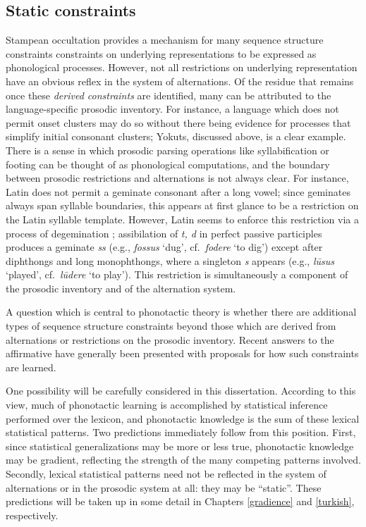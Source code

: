 \subsection{Static constraints}

Stampean occultation provides a mechanism for many sequence structure constraints constraints on underlying representations to be expressed as phonological processes. 
However, not all restrictions on underlying representation have an obvious reflex in the system of alternations.
Of the residue that remains once these \emph{derived constraints} are identified, many can be attributed to the language-specific prosodic inventory.
For instance, a language which does not permit onset clusters may do so without there being evidence for processes that simplify initial consonant clusters; Yokuts, discussed above, is a clear example.
There is a sense in which prosodic parsing operations like syllabification or footing can be thought of as phonological computations, and the boundary between prosodic restrictions and alternations is not always clear.
For instance, Latin does not permit a geminate consonant after a long vowel; since geminates always span syllable boundaries, this appears at first glance to be a restriction on the Latin syllable template.
However, Latin seems to enforce this restriction via a process of degemination \citep{GormanInPressc}; assibilation of \emph{t, d} in perfect passive participles produces a geminate \emph{ss} (e.g., 
\emph{fossus} `dug', cf.~\emph{fodere} `to dig') except after diphthongs and long monophthongs, where a singleton \emph{s} appears (e.g., \emph{lūsus} `played', cf.~\emph{lūdere} `to play').
This restriction is simultaneously a component of the prosodic inventory and of the alternation system.

A question which is central to phonotactic theory is whether there are additional types of sequence structure constraints beyond those which are derived from alternations or restrictions on the prosodic inventory.
Recent answers to the affirmative have generally been presented with proposals for how such constraints are learned.

One possibility will be carefully considered in this dissertation.
According to this view, much of phonotactic learning is accomplished by statistical inference performed over the lexicon, and phonotactic knowledge is the sum of these lexical statistical patterns.
Two predictions immediately follow from this position.
First, since statistical generalizations may be more or less true, phonotactic knowledge may be gradient, reflecting the strength of the many competing patterns involved.
Secondly, lexical statistical patterns need not be reflected in the system of alternations or in the prosodic system at all: they may be ``static''.
These predictions will be taken up in some detail in Chapters \ref{gradience} and \ref{turkish}, respectively.

